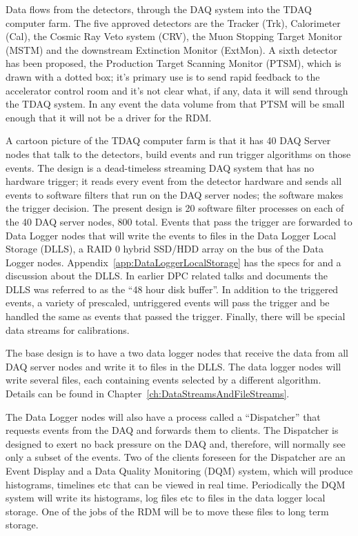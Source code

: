 Data flows from the detectors, through the DAQ system into the TDAQ computer farm.
The five approved detectors are the Tracker (Trk), Calorimeter (Cal), the Cosmic Ray Veto system (CRV),
the Muon Stopping Target Monitor (MSTM) and the downstream Extinction Monitor (ExtMon).
A sixth detector has been proposed, the Production Target Scanning Monitor (PTSM),
which is drawn with a dotted box;
it's primary use is to send rapid feedback to the accelerator control room
and it's not clear what, if any, data it will send through the TDAQ system.
In any event the data volume from that PTSM will be small enough that it will not be
a driver for the RDM.

A cartoon picture of the TDAQ computer farm is that it has 40 DAQ Server nodes
that talk to the detectors, build events and run trigger algorithms on those events.
The design is a dead-timeless streaming DAQ system that has no hardware trigger;
it reads every event from the detector hardware and sends all events to software filters
that run on the DAQ server nodes;
the software makes the trigger decision.
The present design is 20 software filter processes on each of the 40 DAQ server nodes, 800 total.
Events that pass the trigger are forwarded to Data Logger nodes that will write the events
to files in the Data Logger Local Storage (DLLS), a RAID 0 hybrid SSD/HDD array on the bus of the Data Logger nodes.
Appendix~\ref{app:DataLoggerLocalStorage} has the specs for and a discussion about the DLLS.
In earlier DPC related talks and documents the DLLS  was referred to as the ``48 hour disk buffer''.
In addition to the triggered events, a variety of prescaled, untriggered events will pass the
trigger and be handled the same as events that passed the trigger.
Finally, there will be special data streams for calibrations.

The base design is to have a two data logger nodes that receive the data from all DAQ server nodes
and write it to files in the DLLS.
The data logger nodes will write several files, each containing events selected by a different algorithm.
Details can be found in Chapter~\ref{ch:DataStreamsAndFileStreams}.

The Data Logger nodes will also have a process called a ``Dispatcher''
that requests events from the DAQ and forwards them to clients.
The Dispatcher is designed to exert no back pressure on the DAQ
and, therefore, will normally see only a subset of the events.
Two of the clients foreseen for the Dispatcher are an Event Display and
a Data Quality Monitoring (DQM) system,
which will produce histograms, timelines etc that can be viewed in real time.
Periodically the DQM system will write its histograms, log files etc to
files in the data logger local storage.  One of the jobs of the RDM will be
to move these files to long term storage.

